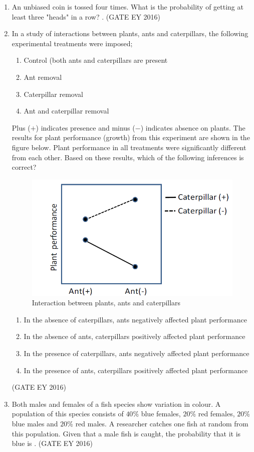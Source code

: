 \documentclass[journal]{IEEEtran}
\begin{document}
\begin{enumerate}[label=Q.\arabic*.]
\item An unbiased coin is tossed four times. What is the probability of getting at least three "heads" in a row? \underline{\hspace{3cm}}.
\hfill{(GATE EY 2016)}
\bigskip 
\item In a study of interactions between plants, ants and caterpillars, the following experimental treatments were imposed;
\begin{enumerate}[label=(\roman*)]
        \item Control (both ants and caterpillars are present
        \item Ant removal
        \item Caterpillar removal
        \item Ant and caterpillar removal
    \end{enumerate}
Plus ($+$) indicates presence and minus ($-$) indicates absence on plants. The results for plant performance (growth) from this experiment are shown in the figure below. Plant performance in all treatments were significantly different from each other. Based on these results, which of the following inferences is correct? 
\begin{figure}
    \centering
    \includegraphics[width=0.5\columnwidth]{figs/Q-48.png}
    \caption{Interaction between plants, ants and caterpillars}
    \label{Fig.6}
\end{figure}
\begin{enumerate}
    \item In the absence of caterpillars, ants negatively affected plant performance
    \item In the absence of ants, caterpillars positively affected plant performance
    \item In the presence of caterpillars, ants negatively affected plant performance
    \item In the presence of ants, caterpillars positively affected plant performance
\end{enumerate}
\hfill{(GATE EY 2016)}

\item Both males and females of a fish species show variation in colour. A population of this species consists of $40$\% blue females, $20$\% red females, $20$\% blue males and $20$\% red males. A researcher catches one fish at random from this population. Given that a male fish is caught, the probability that it is blue is \underline{\hspace{3cm}}.
\hfill{(GATE EY 2016)}


\end{enumerate}
\end{document}
